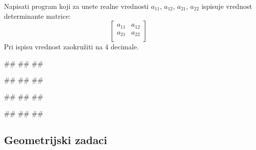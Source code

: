 \begin{Exercise}[label=p1.10_]
Napisati program koji za unete realne vrednosti $a_{11}$, $a_{12}$, $a_{21}$, $a_{22}$  ispisuje vrednost determinante matrice:
\[
 \begin{bmatrix}
  a_{11} & a_{12} \\
  a_{21} & a_{22} \\
 \end{bmatrix}
\]
Pri ispisu vrednost zaokružiti na $4$ decimale.


\begin{miditest}
\begin{upotreba}{1}
#\naslovInt#
##
##
\end{upotreba}
\end{miditest}
\begin{miditest}
\begin{upotreba}{2}
#\naslovInt#
##
##
\end{upotreba}
\end{miditest}

\begin{miditest}
\begin{upotreba}{3}
#\naslovInt#
##
##
\end{upotreba}
\end{miditest}
\begin{miditest}
\begin{upotreba}{4}
#\naslovInt#
##
##
\end{upotreba}
\end{miditest}
\end{Exercise}

\subsection{Geometrijski zadaci}

